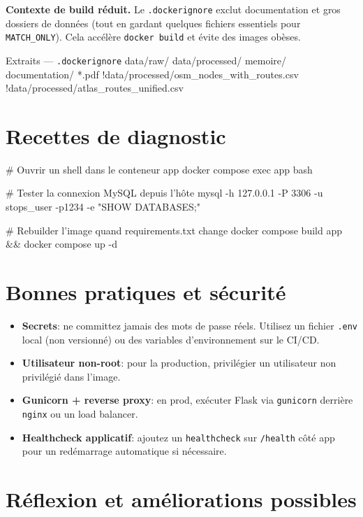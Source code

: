 \textbf{Contexte de build réduit.} Le \texttt{.dockerignore} exclut documentation et gros dossiers de données (tout en gardant quelques fichiers essentiels pour \texttt{MATCH\_ONLY}). Cela accélère \texttt{docker build} et évite des images obèses.

\begin{codebox}[language=bash]{Extraits — \texttt{.dockerignore}}
data/raw/
data/processed/
memoire/
documentation/
*.pdf
!data/processed/osm_nodes_with_routes.csv
!data/processed/atlas_routes_unified.csv
\end{codebox}

\section{Recettes de diagnostic}

\begin{cmdbox}
# Ouvrir un shell dans le conteneur app
docker compose exec app bash

# Tester la connexion MySQL depuis l'hôte
mysql -h 127.0.0.1 -P 3306 -u stops_user -p1234 -e "SHOW DATABASES;"

# Rebuilder l'image quand requirements.txt change
docker compose build app && docker compose up -d
\end{cmdbox}

\section{Bonnes pratiques et sécurité}

\begin{itemize}
  \item \textbf{Secrets}: ne committez jamais des mots de passe réels. Utilisez un fichier \texttt{.env} local (non versionné) ou des variables d'environnement sur le CI/CD.
  \item \textbf{Utilisateur non-root}: pour la production, privilégier un utilisateur non privilégié dans l'image.
  \item \textbf{Gunicorn + reverse proxy}: en prod, exécuter Flask via \texttt{gunicorn} derrière \texttt{nginx} ou un load balancer.
  \item \textbf{Healthcheck applicatif}: ajoutez un \texttt{healthcheck} sur \texttt{/health} côté app pour un redémarrage automatique si nécessaire.
\end{itemize}

\section{Réflexion et améliorations possibles}

